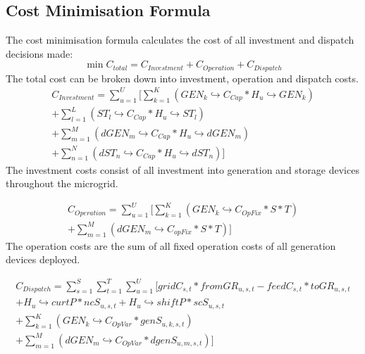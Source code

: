 \documentclass[
	11pt,								%
	DIV10,								%
	a4paper,         					%
	oneside,							%
	headheight=20pt,					%
	footheight=20pt,					%
    parskip=full,						%
    listof=totoc,						%
	bibliography=totoc,					%
	index=totoc,						%
]{scrartcl}
\begin{document}


\subsection{Cost Minimisation Formula}
The cost minimisation formula calculates the cost of all investment and dispatch decisions made:
\begin{equation}
	\min C_{total} = C_{Investment} + C_{Operation} + C_{Dispatch}
\end{equation}
The total cost can be broken down into investment, operation and dispatch costs.
\begin{equation}
	\begin{split}
		C_{Investment} = \sum_{u=1}^{U}[\sum_{k=1}^K{(GEN_k\hookrightarrow  C_{Cap} * H_u\hookrightarrow  GEN_k)}\\
		+ \sum_{l=1}^L{(ST_l\hookrightarrow  C_{Cap} * H_u\hookrightarrow  ST_l)}\\
		+ \sum_{m=1}^M{(dGEN_m\hookrightarrow  C_{Cap} * H_u\hookrightarrow  dGEN_m)}\\
		+ \sum_{n=1}^N{(dST_n\hookrightarrow  C_{Cap} * H_u\hookrightarrow  dST_n)}]
	\end{split}
\end{equation}
The investment costs consist of all investment into generation and storage devices throughout the microgrid.

\begin{equation}
	\begin{split}
		C_{Operation} = \sum_{u=1}^{U}[\sum_{k=1}^{K}(GEN_k\hookrightarrow  C_{OpFix} * S * T)\\
	 	+ \sum_{m=1}^{M}(dGEN_m\hookrightarrow  C_{opFix} * S * T)]
	\end{split}
\end{equation}
The operation costs are the sum of all fixed operation costs of all generation devices deployed.

\begin{equation}
	\begin{split}
		C_{Dispatch} = \sum_{s=1}^{S}\sum_{t=1}^{T}\sum_{u=1}^{U}[gridC_{s,t} * fromGR_{u,s,t} - feedC_{s,t} * toGR_{u,s,t}\\
		+ H_u\hookrightarrow  curtP * ncS_{u,s,t} + H_u\hookrightarrow  shiftP * scS_{u,s,t}\\
		+ \sum_{k=1}^K(GEN_k\hookrightarrow  C_{OpVar} * genS_{u,k,s,t})\\ 
		+ \sum_{m=1}^M(dGEN_m\hookrightarrow  C_{OpVar} * dgenS_{u,m,s,t})]
	\end{split}
\end{equation}
\end{document}
